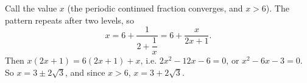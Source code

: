 Call the value $x$ (the periodic continued fraction converges, and $x>6$). The pattern repeats after two levels, so
\[x=6+\dfrac{1}{2+\dfrac1x}=6+\dfrac{x}{2x+1}.\]
Then $x(2x+1)=6(2x+1)+x$, i.e. $2x^2-12x-6=0$, or $x^2-6x-3=0$. So $x=3\pm2\sqrt3$, and since $x>6$, $x=\boxed{3+2\sqrt3}$.
